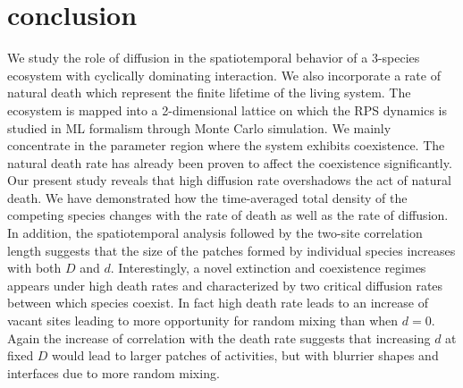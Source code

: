 \documentclass[aps, pre, twocolumn, amsmath, superscriptaddress,showkeys,showpacs]{revtex4-1}
\begin{document}
{{%





\section{conclusion}
\label{conclusion}	
	{ We study the role of diffusion in the spatiotemporal behavior of a 3-species ecosystem with cyclically dominating interaction. We also incorporate a rate of natural death which represent the finite lifetime of the living system. The ecosystem is mapped into a 2-dimensional lattice on which the RPS dynamics is studied in ML formalism through Monte Carlo simulation.
We mainly concentrate in the parameter region where the system exhibits coexistence. The natural death rate has already been proven to affect the coexistence significantly. Our present study reveals that high diffusion rate overshadows the act of natural death.} 
We have demonstrated how the time-averaged total density of the competing species changes with the rate of death as well as the rate of diffusion.
{In addition, %
{the spatiotemporal analysis followed by the two-site correlation length suggests that the size of the patches formed by individual species increases with both $D$ and $d$}. Interestingly,   a novel extinction and coexistence regimes appears under high death rates and characterized by two critical diffusion rates between which species coexist.}	
 In fact high death rate leads to an increase of vacant sites leading to more opportunity for random mixing than when $d=0$. Again the increase of correlation with the death rate suggests that increasing $d$ at fixed $D$ would lead to larger patches of activities, but with blurrier shapes and interfaces due to more random mixing.}
}
\end{document}
